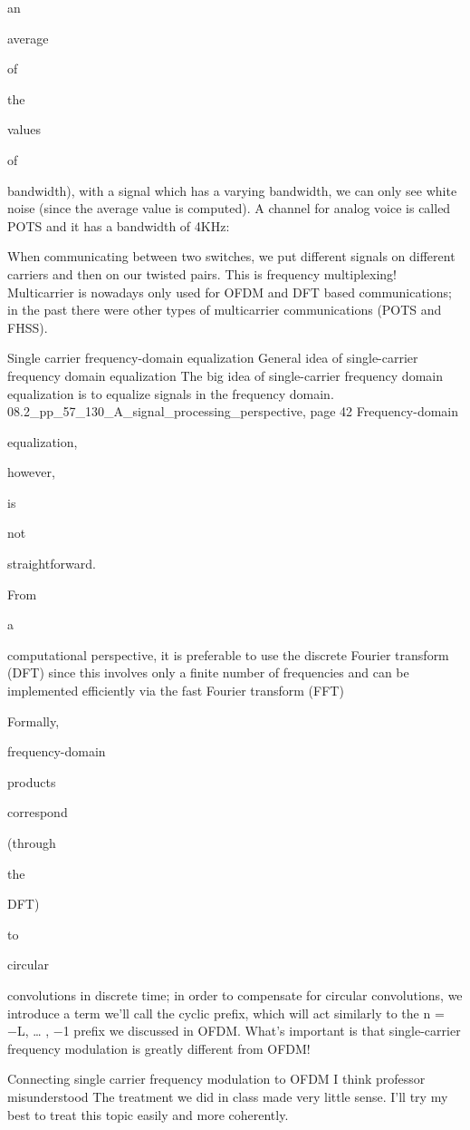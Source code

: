 {an

average

of

the

values

of

bandwidth), with a signal which has a varying bandwidth, we can only see white noise
(since the average value is computed).
A channel for analog voice is called POTS and it has a bandwidth of 4KHz:

When communicating between two switches, we put different signals on different carriers and then on our twisted pairs.
This is frequency multiplexing!
Multicarrier is nowadays only used for OFDM and DFT based communications; in the past there were other types of multicarrier communications (POTS and FHSS).

Single carrier frequency-domain equalization General idea of single-carrier frequency domain equalization The big idea of single-carrier frequency domain equalization is to equalize signals in the frequency domain.
08.2_pp_57_130_A_signal_processing_perspective, page 42 Frequency-domain

equalization,

however,

is

not

straightforward.

From

a

computational perspective, it is preferable to use the discrete Fourier transform
(DFT) since this involves only a finite number of frequencies and can be implemented efficiently via the fast Fourier transform (FFT)

Formally,

frequency-domain

products

correspond

(through

the

DFT)

to

circular

convolutions in discrete time; in order to compensate for circular convolutions, we introduce a term we'll call the cyclic prefix, which will act similarly to the n = −L, … , −1 prefix we discussed in OFDM.
What's important is that single-carrier frequency modulation is greatly different from OFDM!

Connecting single carrier frequency modulation to OFDM I think professor misunderstood The treatment we did in class made very little sense. I'll try my best to treat this topic easily and more coherently.

}
